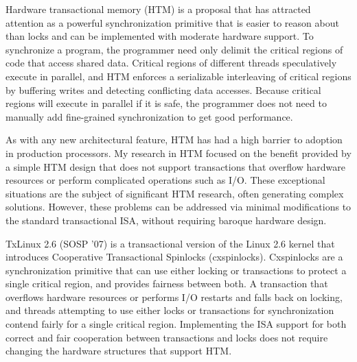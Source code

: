 \documentclass{article}
\begin{document}
Hardware transactional memory (HTM) is a proposal that has attracted
attention as a powerful synchronization primitive that is easier to reason
about than locks and can be implemented with moderate hardware support.
To synchronize a program, the programmer need only delimit the critical
regions of code that access shared data.
Critical regions of
different threads speculatively execute in parallel, and HTM enforces a
serializable interleaving of critical regions by buffering writes and
detecting conflicting data accesses.  Because critical regions will execute
in parallel if it is safe, the programmer does not need to manually add
fine-grained synchronization to get good performance.

As with any new architectural feature, HTM has had a high barrier to
adoption in production processors.
My research in HTM focused on the benefit provided by a simple HTM design
that does not support transactions that overflow hardware resources or
perform complicated operations such as I/O. These exceptional situations
are the subject of significant HTM research, often generating complex
solutions.
However, these problems can be addressed via minimal modifications to the
standard transactional ISA, without requiring baroque hardware design.

TxLinux 2.6 (SOSP ’07) is a transactional version of the Linux 2.6 kernel
that introduces Cooperative Transactional Spinlocks (cxspinlocks).
Cxspinlocks are a synchronization primitive that can use either locking or
transactions to protect a single critical region, and provides fairness
between both. A transaction that overflows hardware resources or performs
I/O restarts and falls back on locking, and threads attempting to use
either locks or transactions for synchronization contend fairly for a
single critical region. Implementing the ISA support for both correct and
fair cooperation between transactions and locks does not require changing
the hardware structures that support HTM.
\end{document}
